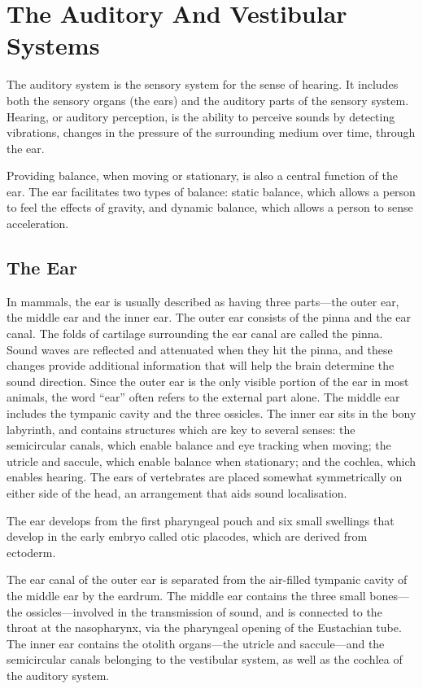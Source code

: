 \documentclass[]{book}
\begin{document}
\hypertarget{the-auditory-and-vestibular-systems}{%
\chapter{The Auditory And Vestibular Systems}\label{the-auditory-and-vestibular-systems}}

The auditory system is the sensory system for the sense of hearing. It includes both the sensory organs (the ears) and the auditory parts of the sensory system. Hearing, or auditory perception, is the ability to perceive sounds by detecting vibrations, changes in the pressure of the surrounding medium over time, through the ear.

Providing balance, when moving or stationary, is also a central function of the ear. The ear facilitates two types of balance: static balance, which allows a person to feel the effects of gravity, and dynamic balance, which allows a person to sense acceleration.

\hypertarget{the-ear}{%
\section{The Ear}\label{the-ear}}

In mammals, the ear is usually described as having three parts---the outer ear, the middle ear and the inner ear. The outer ear consists of the pinna and the ear canal. The folds of cartilage surrounding the ear canal are called the pinna. Sound waves are reflected and attenuated when they hit the pinna, and these changes provide additional information that will help the brain determine the sound direction. Since the outer ear is the only visible portion of the ear in most animals, the word ``ear'' often refers to the external part alone. The middle ear includes the tympanic cavity and the three ossicles. The inner ear sits in the bony labyrinth, and contains structures which are key to several senses: the semicircular canals, which enable balance and eye tracking when moving; the utricle and saccule, which enable balance when stationary; and the cochlea, which enables hearing. The ears of vertebrates are placed somewhat symmetrically on either side of the head, an arrangement that aids sound localisation.

The ear develops from the first pharyngeal pouch and six small swellings that develop in the early embryo called otic placodes, which are derived from ectoderm.

The ear canal of the outer ear is separated from the air-filled tympanic cavity of the middle ear by the eardrum. The middle ear contains the three small bones---the ossicles---involved in the transmission of sound, and is connected to the throat at the nasopharynx, via the pharyngeal opening of the Eustachian tube. The inner ear contains the otolith organs---the utricle and saccule---and the semicircular canals belonging to the vestibular system, as well as the cochlea of the auditory system.
\end{document}
